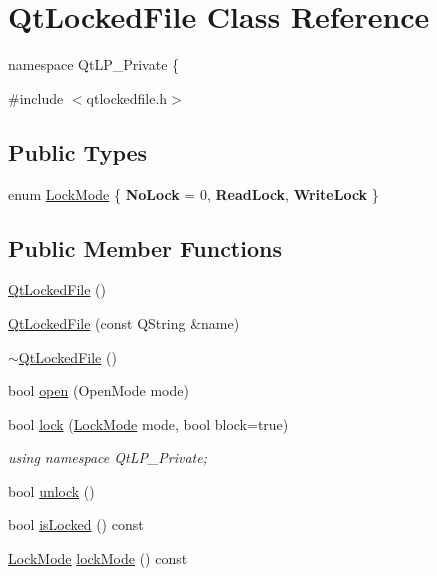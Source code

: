 \hypertarget{class_qt_locked_file}{
\section{QtLockedFile Class Reference}
\label{class_qt_locked_file}
}


namespace QtLP\_\-Private \{  




{\ttfamily \#include $<$qtlockedfile.h$>$}

\subsection*{Public Types}
\begin{DoxyCompactItemize}
\item 
enum \hyperlink{class_qt_locked_file_aef385609a0a280b52334b972b04074cc}{LockMode} \{ {\bfseries NoLock} =  0, 
{\bfseries ReadLock}, 
{\bfseries WriteLock}
 \}
\end{DoxyCompactItemize}
\subsection*{Public Member Functions}
\begin{DoxyCompactItemize}
\item 
\hyperlink{class_qt_locked_file_a69bf1d82b1ca46f97466634d8f9587aa}{QtLockedFile} ()
\item 
\hyperlink{class_qt_locked_file_a8b7a228ae02dca4bb99743219d0cdb7b}{QtLockedFile} (const QString \&name)
\item 
\hyperlink{class_qt_locked_file_ae22e087171c094da6cfb3282e838c9d4}{$\sim$QtLockedFile} ()
\item 
bool \hyperlink{class_qt_locked_file_a2e81bbaa7b1aaa83cf79284e66dbad79}{open} (OpenMode mode)
\item 
bool \hyperlink{class_qt_locked_file_af7876c08254a16d00022939f2fb9a8b8}{lock} (\hyperlink{class_qt_locked_file_aef385609a0a280b52334b972b04074cc}{LockMode} mode, bool block=true)
\begin{DoxyCompactList}\small\item\em using namespace QtLP\_\-Private; \end{DoxyCompactList}\item 
bool \hyperlink{class_qt_locked_file_abb4d7e6211d9e6e14afaa661818fb2bf}{unlock} ()
\item 
bool \hyperlink{class_qt_locked_file_ac93115b12ddd6c3275a5a81a94b6c919}{isLocked} () const 
\item 
\hyperlink{class_qt_locked_file_aef385609a0a280b52334b972b04074cc}{LockMode} \hyperlink{class_qt_locked_file_aabfd6fb28f249a5fb01f3965de0e41f1}{lockMode} () const 
\end{DoxyCompactItemize}


